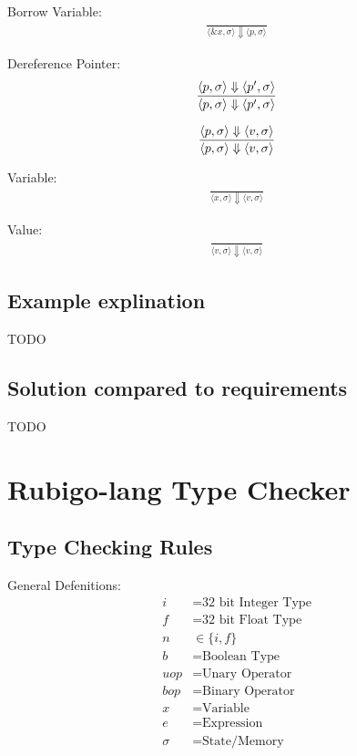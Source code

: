 \documentclass[12pt]{article}
\begin{document}
	Borrow Variable:
	\begin{align*}
		\frac{}
		{\langle \&x, \sigma \rangle\Downarrow \langle p, \sigma \rangle}
	\end{align*}

	Dereference Pointer:
	\begin{align*}
		\frac{\langle \*p, \sigma \rangle\Downarrow \langle p', \sigma \rangle}
		{\langle \*p, \sigma \rangle\Downarrow \langle p', \sigma \rangle}
	\end{align*}

	\begin{align*}
		\frac{\langle \*p, \sigma \rangle\Downarrow \langle v, \sigma \rangle}
		{\langle \*p, \sigma \rangle\Downarrow \langle v, \sigma \rangle}
	\end{align*}	

	Variable:
	\begin{align*}
		\frac{}
		{\langle x, \sigma \rangle\Downarrow \langle v, \sigma \rangle}
	\end{align*}

	Value:
	\begin{align*}
		\frac{}
		{\langle v, \sigma \rangle\Downarrow \langle v, \sigma \rangle}
	\end{align*}

    \subsection{Example explination}
    	TODO
    
    \subsection{Solution compared to requirements}
 	TODO





    \section{Rubigo-lang Type Checker}	
    	\subsection{Type Checking Rules}
	General Defenitions:
    	\begin{align*}
		i &= \text{32 bit Integer Type} \\
		f &= \text{32 bit Float Type} \\
		n &\in \{i, f\} \\
		b &= \text{Boolean Type} \\
		uop &= \text{Unary Operator} \\
		bop &= \text{Binary Operator} \\
		x &= \text{Variable} \\
		e &= \text{Expression} \\
		\sigma &= \text{State/Memory} \\
	\end{align*}
\end{document}
